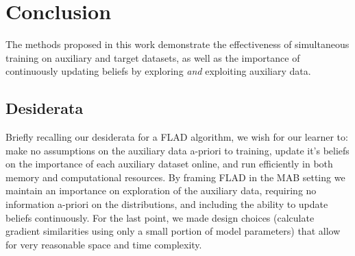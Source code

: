 \section{Conclusion}
The methods proposed in this work demonstrate the effectiveness of simultaneous training on auxiliary and target datasets, as well as the importance of continuously updating beliefs by exploring \textit{and} exploiting auxiliary data.

\subsection{Desiderata}
Briefly recalling our desiderata for a FLAD algorithm, we wish for our learner to: make no assumptions on the auxiliary data a-priori to training, update it's beliefs on the importance of each auxiliary dataset online, and run efficiently in both memory and computational resources. By framing FLAD in the MAB setting we maintain an importance on exploration of the auxiliary data, requiring no information a-priori on the distributions, and including the ability to update beliefs continuously. For the last point, we made design choices (calculate gradient similarities using only a small portion of model parameters) that allow for very reasonable space and time complexity.